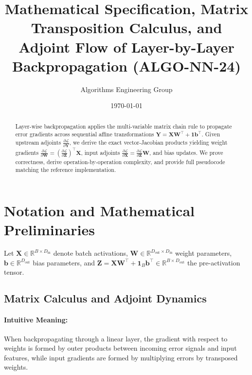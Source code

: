 \documentclass[11pt]{article}
\title{\textbf{Mathematical Specification, Matrix Transposition Calculus, and Adjoint Flow of Layer-by-Layer Backpropagation (ALGO-NN-24)}}
\author{Algorithms Engineering Group}
\date{\today}
\begin{document}
\maketitle

\begin{abstract}
Layer-wise backpropagation applies the multi-variable matrix chain rule to propagate error gradients across sequential affine transformations $\mathbf{Y} = \mathbf{X} \mathbf{W}^\top + \mathbf{1} \mathbf{b}^\top$. Given upstream adjoints $\frac{\partial \mathcal{L}}{\partial \mathbf{Y}}$, we derive the exact vector-Jacobian products yielding weight gradients $\frac{\partial \mathcal{L}}{\partial \mathbf{W}} = \left(\frac{\partial \mathcal{L}}{\partial \mathbf{Z}}\right)^\top \mathbf{X}$, input adjoints $\frac{\partial \mathcal{L}}{\partial \mathbf{X}} = \frac{\partial \mathcal{L}}{\partial \mathbf{Z}} \mathbf{W}$, and bias updates. We prove correctness, derive operation-by-operation complexity, and provide full pseudocode matching the reference implementation.
\end{abstract}

\section{Notation and Mathematical Preliminaries}
\label{sec:notation}

Let $\mathbf{X} \in \mathbb{R}^{B \times D_{\mathrm{in}}}$ denote batch activations, $\mathbf{W} \in \mathbb{R}^{D_{\mathrm{out}} \times D_{\mathrm{in}}}$ weight parameters, $\mathbf{b} \in \mathbb{R}^{D_{\mathrm{out}}}$ bias parameters, and $\mathbf{Z} = \mathbf{X} \mathbf{W}^\top + \mathbf{1}_B \mathbf{b}^\top \in \mathbb{R}^{B \times D_{\mathrm{out}}}$ the pre-activation tensor.

\subsection{Matrix Calculus and Adjoint Dynamics}
\paragraph{Intuitive Meaning:} When backpropagating through a linear layer, the gradient with respect to weights is formed by outer products between incoming error signals and input features, while input gradients are formed by multiplying errors by transposed weights.
\end{document}
